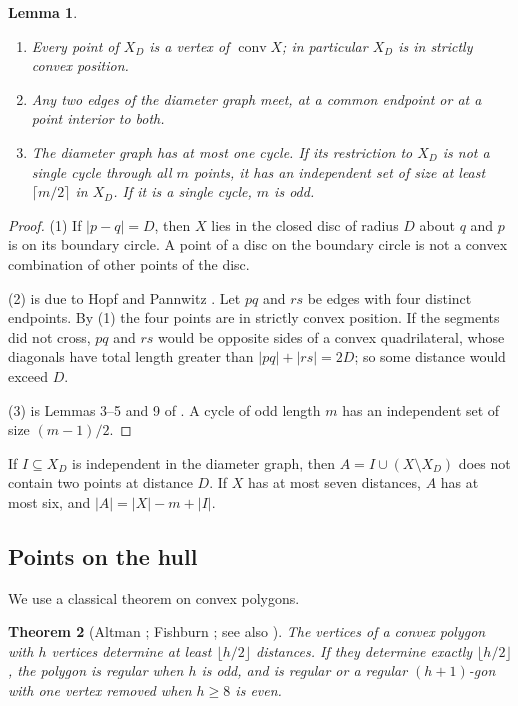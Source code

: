 \documentclass[11pt]{amsart}
\newtheorem{theorem}{Theorem}
\newtheorem{lemma}[theorem]{Lemma}
\theoremstyle{definition}
\theoremstyle{remark}
\newcommand{\conv}{\operatorname{conv}}
\begin{document}
\begin{lemma}\label{lem:diam}
\leavevmode
\begin{enumerate}
\item Every point of $X_D$ is a vertex of $\conv X$; in particular $X_D$ is in strictly convex position.
\item Any two edges of the diameter graph meet, at a common endpoint or at a point interior to both.
\item The diameter graph has at most one cycle. If its restriction to $X_D$ is not a single cycle through
  all $m$ points, it has an independent set of size at least $\lceil m/2\rceil$ in $X_D$. If it is a single
  cycle, $m$ is odd.
\end{enumerate}
\end{lemma}

\begin{proof}
(1) If $|p-q|=D$, then $X$ lies in the closed disc of radius $D$ about $q$ and $p$ is on its boundary circle.
A point of a disc on the boundary circle is not a convex combination of other points of the disc.

(2) is due to Hopf and Pannwitz \cite{HP}. Let $pq$ and $rs$ be edges with four distinct endpoints. By (1)
the four points are in strictly convex position. If the segments did not cross, $pq$ and $rs$ would be
opposite sides of a convex quadrilateral, whose diagonals have total length greater than $|pq|+|rs|=2D$;
so some distance would exceed $D$.

(3) is Lemmas 3--5 and 9 of \cite{W}. A cycle of odd length $m$ has an independent set of size $(m-1)/2$.
\end{proof}

If $I\subseteq X_D$ is independent in the diameter graph, then $A=I\cup(X\setminus X_D)$ does not contain two
points at distance $D$. If $X$ has at most seven distances, $A$ has at most six, and $|A|=|X|-m+|I|$.

\subsection{Points on the hull}
We use a classical theorem on convex polygons.

\begin{theorem}[Altman \cite{A}; Fishburn \cite{F}; see also {\cite[Lemma 2]{EF}}]\label{thm:altman}
The vertices of a convex polygon with $h$ vertices determine at least $\lfloor h/2\rfloor$ distances. If they
determine exactly $\lfloor h/2\rfloor$, the polygon is regular when $h$ is odd, and is regular or a regular
$(h+1)$-gon with one vertex removed when $h\ge8$ is even.
\end{theorem}
\end{document}
